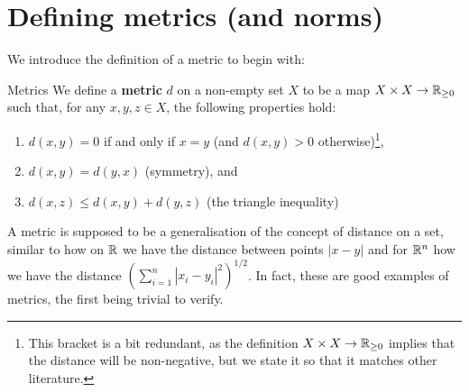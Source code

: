 \section{Defining metrics (and norms)}

We introduce the definition of a metric to begin with:
\begin{bdefin}{Metrics}{}
We define a \textbf{metric} $d$ on a non-empty set $X$ to be a map $X \times X \to \mathbb{R}_{\geq 0}$ such that, for any $x,y,z \in X$, the following properties hold:
\begin{enumerate}
    \item $d(x,y)=0$ if and only if $x=y$ (and $d(x,y)>0$ otherwise)\footnote{This bracket is a bit redundant, as the definition $X \times X \to \mathbb{R}_{\geq 0}$ implies that the distance will be non-negative, but we state it so that it matches other literature.},
    \item $d(x,y) = d(y,x)$ (symmetry), and
    \item $d(x,z) \leq d(x,y) + d(y,z)$ (the triangle inequality)
\end{enumerate}
\end{bdefin}

A metric is supposed to be a generalisation of the concept of distance on a set, similar to how on $\mathbb{R}$ we have the distance between points $|x-y|$ and for $\mathbb{R}^{n}$ how we have the distance $\left(\sum_{i=1}^{n} |x_{i} - y_{i}|^{2}\right)^{1/2}$. In fact, these are good examples of metrics, the first being trivial to verify. %


